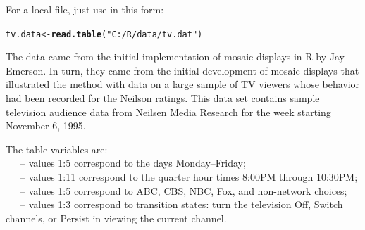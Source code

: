\documentclass[10pt,twoside]{article}\usepackage[]{graphicx}\usepackage[]{color}
\makeatletter
\newcommand{\hlstr}[1]{\textcolor[rgb]{0.192,0.494,0.8}{#1}}%
\newcommand{\hlstd}[1]{\textcolor[rgb]{0.345,0.345,0.345}{#1}}%
\newcommand{\hlkwb}[1]{\textcolor[rgb]{0.69,0.353,0.396}{#1}}%
\newcommand{\hlkwd}[1]{\textcolor[rgb]{0.737,0.353,0.396}{\textbf{#1}}}%
\newenvironment{kframe}{%
 \def\at@end@of@kframe{}%
 \ifinner\ifhmode%
  \def\at@end@of@kframe{\end{minipage}}%
  \begin{minipage}{\columnwidth}%
 \fi\fi%
 \def\FrameCommand##1{\hskip\@totalleftmargin \hskip-\fboxsep
 \colorbox{shadecolor}{##1}\hskip-\fboxsep
     \hskip-\linewidth \hskip-\@totalleftmargin \hskip\columnwidth}%
 \MakeFramed {\advance\hsize-\width
   \@totalleftmargin\z@ \linewidth\hsize
   \@setminipage}}%
 {\par\unskip\endMakeFramed%
 \at@end@of@kframe}
\newenvironment{knitrout}{}{} %
\newcommand{\codefun}[1]{\code{#1()}}
\let\proglang=\textsf
\makeatother
\begin{document}
For a local file, just use \codefun{read.table} in this form:
\begin{knitrout}
\color{fgcolor}\begin{kframe}
\begin{alltt}
\hlstd{tv.data}\hlkwb{<-}\hlkwd{read.table}\hlstd{(}\hlstr{"C:/R/data/tv.dat"}\hlstd{)}
\end{alltt}
\end{kframe}
\end{knitrout}

The data  came from the initial implementation of 
mosaic displays in \proglang{R} by Jay Emerson. 
In turn, they came from the initial development of mosaic displays 
\citep{vcd:Hartigan+Kleiner:1984}
that illustrated the method with data on a large sample of TV viewers
whose behavior had been recorded for the Neilson ratings.
This data set contains sample television audience data from Neilsen
Media Research for the week starting November 6, 1995.

\begin{flushleft}
The table variables are:\\
~~~-- values 1:5 correspond to the days Monday--Friday;\\
~~~-- values 1:11 correspond to the quarter hour times 8:00PM through 10:30PM;\\
~~~-- values 1:5 correspond to ABC, CBS, NBC, Fox, and non-network choices;\\
~~~-- values 1:3 correspond to transition states: turn the television Off, Switch channels, 
 or Persist in viewing the current channel.
\end{flushleft}
	 
\end{document}
